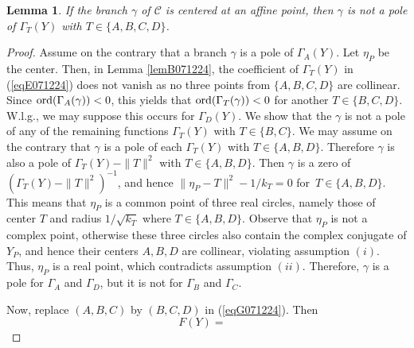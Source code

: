 \documentclass[10pt]{amsart}
\newtheorem{lem}[thm]{Lemma}
\theoremstyle{definition}
\theoremstyle{remark}
\def\cC{\mathcal C}
\begin{document}
\begin{lem}
\label{lem17apr} If the branch $\gamma$ of $\cC$ is centered at an affine point, then $\gamma$ is not a pole of $\Gamma_T(Y)$ with $T\in \{A,B,C,D\}$.
\end{lem}
\begin{proof} Assume on the contrary that a branch $\gamma$ is a pole of $\Gamma_A(Y)$. Let $\eta_P$ be the center.  Then, in Lemma \ref{lemB071224},
 the coefficient of $\Gamma_T(Y)$ in (\ref{eqE071224}) does not vanish as no three points from $\{A,B,C,D\}$ are collinear. Since ${\rm{ord}}(\Gamma_A(\gamma))<0$, this yields that ${\rm{ord}}(\Gamma_T(\gamma))<0$  for another $T\in\{B,C,D\}$. W.l.g., we may suppose this occurs for $\Gamma_D(Y)$.
 We show that the $\gamma$ is not a pole of any of the remaining functions $\Gamma_T(Y)$ with $T\in \{B,C\}$.
We may  assume on the contrary that $\gamma$ is a pole of each $\Gamma_T(Y)$ with $T\in\{A,B,D\}$.
Therefore $\gamma$ is also a pole of $\Gamma_T(Y)-\|T\|^2$ with $T\in \{A,B,D\}$.
Then $\gamma$ is a zero of $(\Gamma_T(Y)-\|T\|^2)^{-1}$, and hence $\|\eta_P-T\|^2-1/k_T=0$ for\ $T\in \{A,B,D\}$.
This means that $\eta_P$ is a common point of three real circles, namely those of center $T$ and radius $1/\sqrt{k_T}$ where $T\in \{A,B,D\}$.
Observe that $\eta_P$ is not a complex point, otherwise these three circles also contain the complex conjugate of $Y_P$, and hence their centers $A,B,D$ are collinear, violating assumption $(i)$. Thus, $\eta_P$ is a real point, which contradicts assumption $(ii)$. Therefore, $\gamma$ is a pole for $\Gamma_A$ and $\Gamma_D$, but it is not for $\Gamma_B$ and $\Gamma_C$.

Now, replace $(A,B,C)$ by $(B,C,D)$ in (\ref{eqG071224}). Then
\begin{equation}
\label{eqF071224}
F(Y)=
\begin{array}{l}


\end{array}
\end{equation}
\end{proof}
\end{document}
